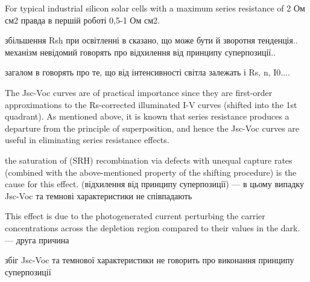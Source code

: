 \documentclass[a4paper,14pt,oneside,openany]{memoir}
\begin{document}
For typical
industrial silicon solar cells with a maximum series resistance of 2 Ом см2\cite{Breitenstein2013,SCRs:Mette}
правда в першій роботі 0,5-1 Ом см2.

збільшення Rsh при освітленні \cite{Iph:KHAN2010}
в \cite{Breitenstein2013}сказано, що може бути й зворотня тенденція.. механізм невідомий 
говорять про відхилення від принципу суперпозиції..

загалом в \cite{Iph:KHAN2010} говорять про те, що від інтенсивності світла залежать і Rs, n, I0....


The Jsc-Voc   curves  are of 
practical  importance  since  they  are  first-order  approximations  
to  the Rs-corrected  illuminated  I-V  curves  (shifted  into 
the  1st  quadrant).  
As  mentioned  above,  it  is  known  that 
series  resistance  produces  a  departure  from  the  principle  of 
superposition,  and  hence  the  Jsc-Voc  curves  are  useful  in 
eliminating  series  resistance  effects.  

the  saturation  of  (SRH) 
recombination  via  defects  with  unequal  capture  rates  (combined with  the above-mentioned  property  of  the shifting  procedure)  is  the  cause  for  this  effect. (відхилення від принципу суперпозиції)  --- в цьому випадку Jsc-Voc та темнові характеристики не співпадають
\cite{Robinson}

This  effect  is  due to  the photogenerated  current  perturbing  the  carrier  concentrations  across  the  depletion  region 
compared  to  their  values  in  the  dark.  ---  друга причина

збіг Jsc-Voc та темнової характеристики не говорить про виконання принципу суперпозиції


\end{document}
